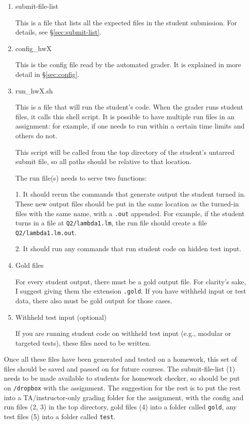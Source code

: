 \documentclass[12pt]{article}
\begin{document}
\begin{enumerate}
\item {submit-file-list

This is a file that lists all the expected files in the student submission. For details, see \S\ref{sec:submit-list}.
}
\item {config\_hwX

This is the config file read by the automated grader. It is explained in more detail in \S\ref{sec:config}.
}
\item {run\_hwX.sh

This is a file that will run the student's code. When the grader runs student files, it calls this shell script. It is possible to have multiple run files in an assignment: for example, if one needs to run within a certain time limits and others do not.

This script will be called from the top directory of the student's untarred submit file, so all paths should be relative to that location.

The run file(s) needs to serve two functions:

1. It should rerun the commands that generate output the student turned in. These new output files should be put in the same location as the turned-in files with the same name, with a \texttt{.out} appended. For example, if the student turns in a file at \texttt{Q2/lambda1.lm}, the run file should create a file \texttt{Q2/lambda1.lm.out}.

2. It should run any commands that run student code on hidden test input.
}
\item {Gold files

For every student output, there must be a gold output file. For clarity's sake, I suggest giving them the extension \texttt{.gold}. If you have withheld input or test data, there also must be gold output for those cases.
}
\item {Withheld test input (optional)

If you are running student code on withheld test input (e.g., modular or targeted tests), these files need to be written.

}
\end{enumerate}

Once all these files have been generated and tested on a homework, this set of files should be saved and passed on for future courses. The submit-file-list (1) needs to be made available to students for homework checker, so should be put on \texttt{/dropbox} with the assignment. The suggestion for the rest is to put the rest into a TA/instructor-only grading folder for the assignment, with the config and run files (2, 3) in the top directory, gold files (4) into a folder called \texttt{gold}, any test files (5) into a folder called \texttt{test}.
\end{document}
